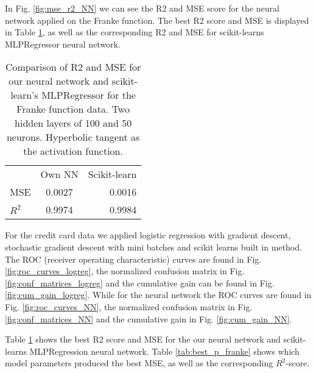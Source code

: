 \documentclass[%
 reprint,
nofootinbib,
 amsmath,amssymb,
 aps,
]{revtex4-2}
\begin{document}
In Fig. \ref{fig:mse_r2_NN} we can see the R2 and MSE score for the neural network applied on the Franke function. The best R2 score and MSE is displayed in Table \ref{tab:best_NN}, as well as the corresponding R2 and MSE for scikit-learns MLPRegressor neural network.

\begin{table}[b]
\caption{\label{tab:best_NN}%
Comparison of R2 and MSE for our neural network and scikit-learn's MLPRegressor for the Franke function data. Two hidden layers of 100 and 50 neurons. Hyperbolic tangent as the activation function.
}
\begin{ruledtabular}
\begin{tabular}{lcr}
\textrm{}&
\multicolumn{1}{c}{\textrm{Own NN}}&
\multicolumn{1}{c}{\textrm{Scikit-learn}} \\
\colrule
MSE & 0.0027 & 0.0016  \\
$R^2$ & 0.9974 & 0.9984  \\
\end{tabular}
\end{ruledtabular}
\end{table}

For the credit card data we applied logistic regression with gradient descent, stochastic gradient descent with mini batches and scikit learns built in method. The ROC (receiver operating characteristic) curves are found in Fig. \ref{fig:roc_curves_logreg}, the normalized confusion matrix in Fig. \ref{fig:conf_matrices_logreg} and the cumulative gain can be found in Fig. \ref{fig:cum_gain_logreg}. While for the neural network the ROC curves are found in Fig. \ref{fig:roc_curves_NN}, the normalized confusion matrix in Fig. \ref{fig:conf_matrices_NN} and the cumulative gain in Fig. \ref{fig:cum_gain_NN}.


Table \ref{tab:best_NN} shows the best R2 score and MSE for the our neural network and scikit-learns MLPRegression neural network. Table \ref{tab:best_p_franke} shows which model parameters produced the best MSE, as well as the corresponding $R^2$-score.
\end{document}

